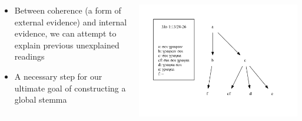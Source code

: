 \documentclass[10pt]{beamer}
\begin{document}
	\begin{frame}
		\begin{columns}
			\begin{column}{0.45\textwidth}
				\begin{itemize}
					\item Between coherence (a form of external evidence) and internal evidence, we can attempt to explain previous unexplained readings
					\item A necessary step for our ultimate goal of constructing a global stemma
				\end{itemize}
			\end{column}
			\begin{column}{0.45\textwidth}
				\begin{center}
					\includegraphics[width=\textwidth]{../img/B25K1V13U24-26-local-stemma-complete.pdf}
				\end{center}
			\end{column}
		\end{columns}
	\end{frame}
\end{document}
